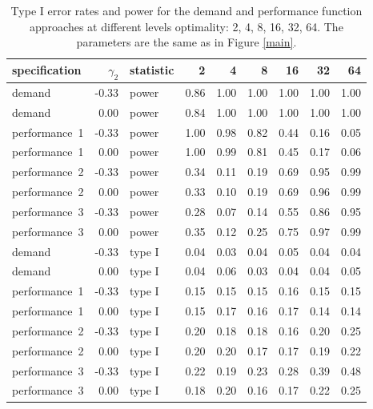 \begin{table}[ht]
\centering
\begingroup\footnotesize
\begin{tabular}{lrlrrrrrr}
  \hline
specification & $\gamma_2$ & statistic & 2 & 4 & 8 & 16 & 32 & 64 \\ 
  \hline
demand & -0.33 & power & 0.86 & 1.00 & 1.00 & 1.00 & 1.00 & 1.00 \\ 
  demand & 0.00 & power & 0.84 & 1.00 & 1.00 & 1.00 & 1.00 & 1.00 \\ 
  performance~1 & -0.33 & power & 1.00 & 0.98 & 0.82 & 0.44 & 0.16 & 0.05 \\ 
  performance~1 & 0.00 & power & 1.00 & 0.99 & 0.81 & 0.45 & 0.17 & 0.06 \\ 
  performance~2 & -0.33 & power & 0.34 & 0.11 & 0.19 & 0.69 & 0.95 & 0.99 \\ 
  performance~2 & 0.00 & power & 0.33 & 0.10 & 0.19 & 0.69 & 0.96 & 0.99 \\ 
  performance~3 & -0.33 & power & 0.28 & 0.07 & 0.14 & 0.55 & 0.86 & 0.95 \\ 
  performance~3 & 0.00 & power & 0.35 & 0.12 & 0.25 & 0.75 & 0.97 & 0.99 \\ 
  demand & -0.33 & type I & 0.04 & 0.03 & 0.04 & 0.05 & 0.04 & 0.04 \\ 
  demand & 0.00 & type I & 0.04 & 0.06 & 0.03 & 0.04 & 0.04 & 0.05 \\ 
  performance~1 & -0.33 & type I & 0.15 & 0.15 & 0.15 & 0.16 & 0.15 & 0.15 \\ 
  performance~1 & 0.00 & type I & 0.15 & 0.17 & 0.16 & 0.17 & 0.14 & 0.14 \\ 
  performance~2 & -0.33 & type I & 0.20 & 0.18 & 0.18 & 0.16 & 0.20 & 0.25 \\ 
  performance~2 & 0.00 & type I & 0.20 & 0.20 & 0.17 & 0.17 & 0.19 & 0.22 \\ 
  performance~3 & -0.33 & type I & 0.22 & 0.19 & 0.23 & 0.28 & 0.39 & 0.48 \\ 
  performance~3 & 0.00 & type I & 0.18 & 0.20 & 0.16 & 0.17 & 0.22 & 0.25 \\ 
   \hline
\end{tabular}
\endgroup
\caption{Type I error rates and power for the demand 
             and performance function approaches at different
             levels optimality: 2, 4, 8, 16, 32, 64. The 
             parameters are the same as in Figure
             \ref{main}.} 
\label{main-table}
\end{table}
